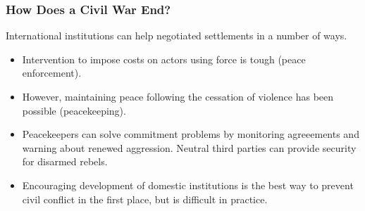 \documentclass[handout]{beamer}
\begin{document}
\begin{frame} 
	\frametitle{\LARGE{How Does a Civil War End?}}
International institutions can help negotiated settlements in a number of ways. \pause 
	\begin{itemize}
		\item Intervention to impose costs on actors using force is tough (peace enforcement). \pause 
		\item However, maintaining peace following the cessation of violence has been possible (peacekeeping). \pause
		\item Peacekeepers can solve commitment problems by monitoring agreeements and warning about renewed aggression. Neutral third parties can provide security for disarmed rebels. \pause
		\item Encouraging development of domestic institutions is the best way to prevent civil conflict in the first place, but is difficult in practice.
	\end{itemize}
\end{frame}
\end{document}
